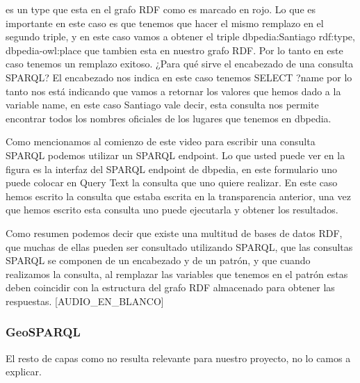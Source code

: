 es un type que esta en el grafo RDF como es marcado en rojo. Lo que es importante en este caso es que tenemos que hacer el mismo remplazo en el segundo triple, y en este caso vamos a obtener el triple dbpedia:Santiago rdf:type, dbpedia-owl:place que tambien esta en nuestro grafo RDF. Por lo tanto en este caso tenemos un remplazo exitoso. ¿Para qué sirve el encabezado de una consulta SPARQL? El encabezado nos indica en este caso tenemos SELECT ?name por lo tanto nos está indicando que vamos a retornar los valores que hemos dado a la variable name, en este caso Santiago vale decir, esta consulta nos permite encontrar todos los nombres oficiales de los lugares que tenemos en dbpedia.

Como mencionamos al comienzo de este video para escribir una consulta SPARQL podemos utilizar un SPARQL endpoint. Lo que usted puede ver en la figura es la interfaz del SPARQL endpoint de dbpedia, en este formulario uno puede colocar en Query Text la consulta que uno quiere realizar. En este caso hemos escrito la consulta que estaba escrita en la transparencia anterior, una vez que hemos escrito esta consulta uno puede ejecutarla y obtener los resultados.

Como resumen podemos decir que existe una multitud de bases de datos RDF, que muchas de ellas pueden ser consultado utilizando SPARQL, que las consultas SPARQL se componen de un encabezado y de un patrón, y que cuando realizamos la consulta, al remplazar las variables que tenemos en el patrón estas deben coincidir con la estructura del grafo RDF almacenado para obtener las respuestas. [AUDIO_EN_BLANCO]

\subsubsection{GeoSPARQL}

El resto de capas como no resulta relevante para nuestro proyecto, no lo camos a explicar.





















